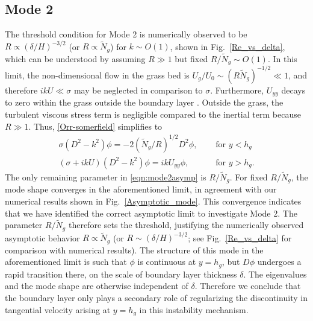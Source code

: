 \documentclass[12pt]{report}   %
\newcommand{\hg}{h_g}
\newcommand{\Rey}{{R}}
\newcommand{\Ndg}{\tilde{N}_g}
\begin{document}
\subsection{Mode 2}
The threshold condition for Mode 2 is numerically observed to be $\Rey \propto ({\delta}/{H})^{-3/2}$ (or $\Rey \propto \Ndg$) for $k\sim O(1)$, shown in Fig.~\ref{Re_vs_delta}, which can be understood by assuming $\Rey \gg 1$ but fixed $\Rey/\Ndg \sim O(1)$.
In this limit, the non-dimensional flow in the grass bed is $U_g/U_0 \sim (\Rey \Ndg)^{-1/2} \ll 1$, and therefore $ikU \ll \sigma$ may be neglected in comparison to $\sigma$. 
Furthermore, $U_{yy}$ decays to zero within the grass outside the boundary layer . 
Outside the grass, the turbulent viscous stress term is negligible compared to the inertial term because $\Rey \gg 1$. 
Thus, \eqref{Orr-somerfield} simplifies to 
\begin{subequations}
\begin{align}
\sigma\left(D^2-k^2\right)\phi = -2{(\Ndg/\Rey)^{1/2}}D^2\phi,  \quad &\text{ for } y<\hg  \label{eqn:mode2asympa} \\
\left(\sigma+ikU\right) \left(D^2-k^2\right)\phi =  ikU_{yy}\phi, \quad &\text{ for } y>\hg. \label{eqn:mode2asympb}
\end{align}
\label{eqn:mode2asymp}
\end{subequations}
The only remaining parameter in \eqref{eqn:mode2asymp} is $\Rey/\Ndg$. 
For fixed $\Rey/\Ndg$, the mode shape converges in the aforementioned limit, in agreement with our numerical results shown in Fig.~\ref{Asymptotic_mode}.
This convergence indicates that we have identified the correct asymptotic limit to investigate Mode 2.
The parameter $\Rey/\Ndg$ therefore sets the threshold, justifying the numerically observed asymptotic behavior $\Rey \propto \Ndg$ (or $\Rey \sim ({\delta}/{H})^{-3/2}$; see Fig.~\ref{Re_vs_delta} for comparison with numerical results).
The structure of this mode in the aforementioned limit is such that $\phi$ is continuous at $y=h_g$, but $D\phi$ undergoes a rapid transition there, on the scale of boundary layer thickness $\delta$.
The eigenvalues and the mode shape are otherwise independent of $\delta$.
Therefore we conclude that the boundary layer only plays a secondary role of regularizing the discontinuity in tangential velocity arising at $y=\hg$ in this instability mechanism.
\end{document}
